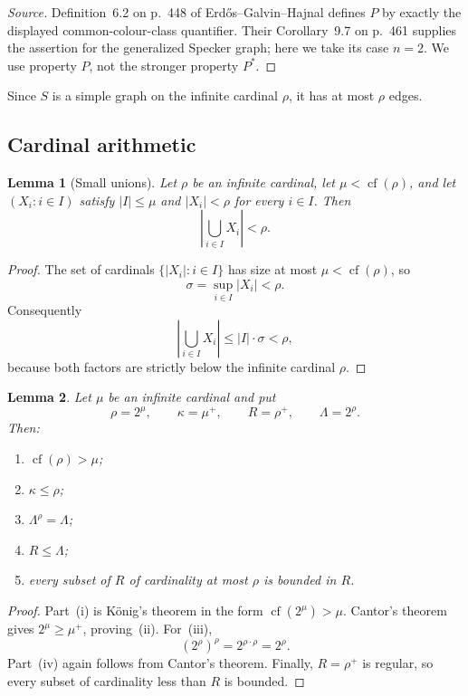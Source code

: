 \documentclass[11pt]{amsart}
\newtheorem{lemma}[lemma]{Lemma}
\theoremstyle{definition}
\theoremstyle{remark}
\numberwithin{equation}{section}
\DeclareMathOperator{\cf}{cf}
\begin{document}
\begin{proof}[Source]
Definition~6.2 on p.~448 of Erd\H{o}s--Galvin--Hajnal \cite{EGH}
defines $P$ by exactly the displayed common-colour-class quantifier.
Their Corollary~9.7 on p.~461 supplies the assertion for the generalized
Specker graph; here we take its case $n=2$.  We use property $P$, not the
stronger property $P^*$.
\end{proof}

Since $S$ is a simple graph on the infinite cardinal $\rho$, it has at
most $\rho$ edges.

\subsection{Cardinal arithmetic}

\begin{lemma}[Small unions]
\label{lem:small-union}
Let $\rho$ be an infinite cardinal, let $\mu<\cf(\rho)$, and let
$(X_i:i\in I)$ satisfy $|I|\le\mu$ and $|X_i|<\rho$ for every $i\in I$.
Then
\[
 \left|\bigcup_{i\in I}X_i\right|<\rho.
\]
\end{lemma}

\begin{proof}
The set of cardinals $\{|X_i|:i\in I\}$ has size at most
$\mu<\cf(\rho)$, so
\[
 \sigma=\sup_{i\in I}|X_i|<\rho.
\]
Consequently
\[
 \left|\bigcup_{i\in I}X_i\right|
 \le |I|\cdot\sigma<\rho,
\]
because both factors are strictly below the infinite cardinal $\rho$.
\end{proof}

\begin{lemma}
\label{lem:cardinal-facts}
Let $\mu$ be an infinite cardinal and put
\[
 \rho=2^\mu,\qquad \kappa=\mu^+,\qquad R=\rho^+,\qquad
 \Lambda=2^\rho.
\]
Then:
\begin{enumerate}[label=\textup{(\roman*)}]
\item $\cf(\rho)>\mu$;
\item $\kappa\le\rho$;
\item $\Lambda^\rho=\Lambda$;
\item $R\le\Lambda$;
\item every subset of $R$ of cardinality at most $\rho$ is bounded in
$R$.
\end{enumerate}
\end{lemma}

\begin{proof}
Part~\textup{(i)} is K\"onig's theorem in the form
$\cf(2^\mu)>\mu$.  Cantor's theorem gives
$2^\mu\ge\mu^+$, proving~\textup{(ii)}.  For~\textup{(iii)},
\[
 (2^\rho)^\rho=2^{\rho\cdot\rho}=2^\rho.
\]
Part~\textup{(iv)} again follows from Cantor's theorem.  Finally,
$R=\rho^+$ is regular, so every subset of cardinality less than $R$ is
bounded.
\end{proof}
\end{document}
